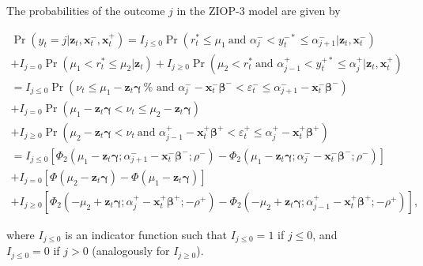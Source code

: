 \documentclass[letterpaper,fleqn,12pt]{article}
\begin{document}
\begin{figure}[H]
\begin{onehalfspace}
\bigskip

The probabilities of the outcome $j$ in the ZIOP-3 model are given by

\begin{flushleft}
\begin{equation}
\begin{array}{l}
\Pr (y_{t}=j|\mathbf{z}_{t},\mathbf{x}_{t}^{-},\mathbf{x}_{t}^{+})=I_{j\leq
0}\Pr (r_{t}^{\ast }\leq \mu _{1}\ \text{and }\alpha _{j}^{-}<y_{t}^{-\ast
}\leq \alpha _{j+1}^{-}|\mathbf{z}_{t},\mathbf{x}_{t}^{-}) \\ 
+I_{j=0}\Pr (\mu _{1}<r_{t}^{\ast }\leq \mu _{2}|\mathbf{z}_{t})+I_{j\geq
0}\Pr (\mu _{2}<r_{t}^{\ast }\ \text{and }\alpha _{j-1}^{+}<y_{t}^{+\ast
}\leq \alpha _{j}^{+}|\mathbf{z}_{t},\mathbf{x}_{t}^{+}) \\ 
=I_{j\leq 0}\Pr (\nu _{t}\leq \mu _{1}-\mathbf{z}_{t}\mathbf{\gamma }\ \text{%
and }\alpha _{j}^{-}-\mathbf{x}_{t}^{-}\mathbf{\beta }^{-}<\varepsilon
_{t}^{-}\leq \alpha _{j+1}^{-}-\mathbf{x}_{t}^{-}\mathbf{\beta }^{-}) \\ 
+I_{j=0}\Pr (\mu _{1}-\mathbf{z}_{t}\mathbf{\gamma }<\nu _{t}\leq \mu _{2}-%
\mathbf{z}_{t}\mathbf{\gamma }) \\ 
+I_{j\geq 0}\Pr (\mu _{2}-\mathbf{z}_{t}\mathbf{\gamma }<\nu _{t}\ \text{and 
}\alpha _{j-1}^{+}-\mathbf{x}_{t}^{+}\mathbf{\beta }^{+}<\varepsilon
_{t}^{+}\leq \alpha _{j}^{+}-\mathbf{x}_{t}^{+}\mathbf{\beta }^{+}) \\ 
=I_{j\leq 0}[\Phi _{2}(\mu _{1}-\mathbf{z}_{t}\mathbf{\gamma };\alpha
_{j+1}^{-}-\mathbf{x}_{t}^{-}\mathbf{\beta }^{-}\mathbf{;}\rho ^{-})-\Phi
_{2}(\mu _{1}-\mathbf{z}_{t}\mathbf{\gamma };\alpha _{j}^{-}-\mathbf{x}%
_{t}^{-}\mathbf{\beta }^{-}\mathbf{;}\rho ^{-})] \\ 
+I_{j=0}[\Phi (\mu _{2}-\mathbf{z}_{t}\mathbf{\gamma })-\Phi (\mu _{1}-%
\mathbf{z}_{t}\mathbf{\gamma })] \\ 
+I_{j\geq 0}[\Phi _{2}(-\mu _{2}+\mathbf{z}_{t}\mathbf{\gamma };\alpha
_{j}^{+}-\mathbf{x}_{t}^{+}\mathbf{\beta }^{+};\mathbf{-}\rho ^{+})-\Phi
_{2}(-\mu _{2}+\mathbf{z}_{t}\mathbf{\gamma };\alpha _{j-1}^{+}-\mathbf{x}%
_{t}^{+}\mathbf{\beta }^{+};\mathbf{-}\rho ^{+})]\text{,}%
\end{array}
\label{Prob CroNOP}
\end{equation}
\end{flushleft}

\noindent where $I_{j\leq 0}$ is an indicator function such that $I_{j\leq
0}=1$ if $j\leq 0$, and $I_{j\leq 0}=0$ if $j>0$ (analogously for $I_{j\geq
0}$).


\end{onehalfspace}
\end{figure}
\end{document}
